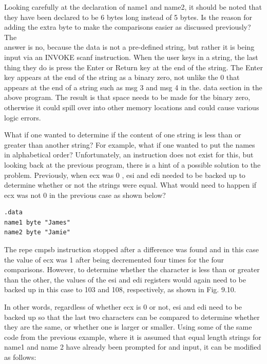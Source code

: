 \documentclass[10pt]{article}
\begin{document}
Looking carefully at the declaration of name1 and name2, it should be noted that they have been declared to be 6 bytes long instead of 5 bytes. Is the reason for adding the extra byte to make the comparisons easier as discussed previously? The\\
answer is no, because the data is not a pre-defined string, but rather it is being input via an INVOKE scanf instruction. When the user keys in a string, the last thing they do is press the Enter or Return key at the end of the string. The Enter key appears at the end of the string as a binary zero, not unlike the 0 that appears at the end of a string such as msg 3 and msg 4 in the. data section in the above program. The result is that space needs to be made for the binary zero, otherwise it could spill over into other memory locations and could cause various logic errors.

What if one wanted to determine if the content of one string is less than or greater than another string? For example, what if one wanted to put the names in alphabetical order? Unfortunately, an instruction does not exist for this, but looking back at the previous program, there is a hint of a possible solution to the problem. Previously, when ecx was 0 , esi and edi needed to be backed up to determine whether or not the strings were equal. What would need to happen if ecx was not 0 in the previous case as shown below?

\begin{verbatim}
.data
name1 byte "James"
name2 byte "Jamie"
\end{verbatim}

The repe cmpsb instruction stopped after a difference was found and in this case the value of ecx was 1 after being decremented four times for the four comparisons. However, to determine whether the character is less than or greater than the other, the values of the esi and edi registers would again need to be backed up in this case to 103 and 108, respectively, as shown in Fig. 9.10.

In other words, regardless of whether ecx is 0 or not, esi and edi need to be backed up so that the last two characters can be compared to determine whether they are the same, or whether one is larger or smaller. Using some of the same code from the previous example, where it is assumed that equal length strings for name1 and name 2 have already been prompted for and input, it can be modified as follows:
\end{document}
